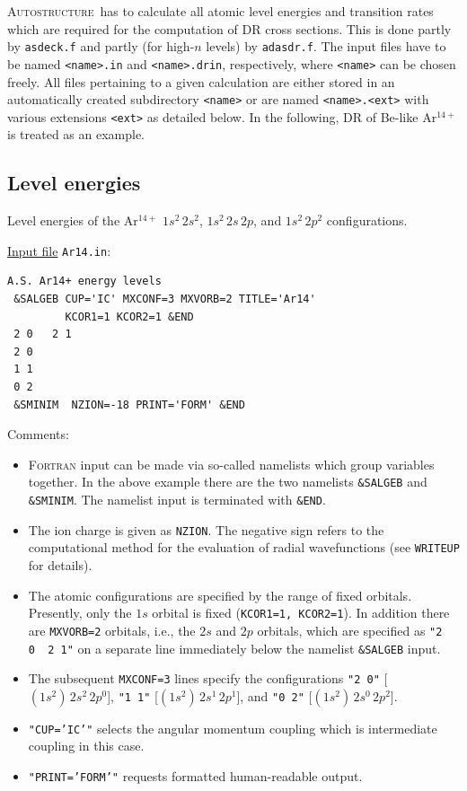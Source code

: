 \documentclass[a4paper,12pt]{article}
\newcommand{\autos}{\textsc{Autostructure}}
\begin{document}
\autos\ has to calculate all atomic level energies and transition rates which are required for the computation of DR cross sections. This is done partly by \texttt{asdeck.f} and partly (for high-$n$ levels) by \texttt{adasdr.f}. The  input files have to be named \texttt{<name>.in} and \texttt{<name>.drin}, respectively, where \texttt{<name>} can be chosen freely. All files pertaining to a given calculation are either stored in an automatically created subdirectory \texttt{<name>} or are named \texttt{<name>.<ext>} with various extensions \texttt{<ext>} as detailed below. In the following, DR of Be-like Ar$^{14+}$ is treated as an example.


\subsection{Level energies}\label{autos:DRlev}

Level energies of the Ar$^{14+}$ $1s^2\,2s^2$, $1s^2\,2s\,2p$, and $1s^2\,2p^2$ configurations.

\underline{Input file} \texttt{Ar14.in}:
\begin{verbatim}
A.S. Ar14+ energy levels
 &SALGEB CUP='IC' MXCONF=3 MXVORB=2 TITLE='Ar14'
         KCOR1=1 KCOR2=1 &END
 2 0   2 1
 2 0
 1 1
 0 2
 &SMINIM  NZION=-18 PRINT='FORM' &END
\end{verbatim}

Comments:
\begin{itemize}
\item \textsc{Fortran} input can be made via so-called namelists which group variables together. In the above example there are the two namelists \texttt{\&SALGEB} and \texttt{\&SMINIM}. The namelist input is terminated with \texttt{\&END}.
\item The ion charge is given as \texttt{NZION}. The negative sign refers to the computational method for the evaluation of radial wavefunctions (see \texttt{WRITEUP} for details).
\item The atomic configurations  are specified by the range of fixed orbitals. Presently, only the $1s$ orbital is fixed (\texttt{KCOR1=1, KCOR2=1}). In addition there are \texttt{MXVORB=2} orbitals, i.e., the $2s$ and $2p$ orbitals, which are specified as \texttt{"2 0~ 2 1"} on a separate line immediately below the namelist \texttt{\&SALGEB} input.
\item The subsequent  \texttt{MXCONF=3} lines specify the configurations \texttt{"2 0"} [$(1s^2)\,2s^2\,2p^0$],  \texttt{"1 1"} [$(1s^2)\,2s^1\,2p^1$], and  \texttt{"0 2"} [$(1s^2)\,2s^0\,2p^2$].
\item \texttt{"CUP='IC'"} selects the angular momentum coupling which is intermediate coupling in this case.
    \item \texttt{"PRINT='FORM'"} requests formatted human-readable output.
\end{itemize}
\end{document}

